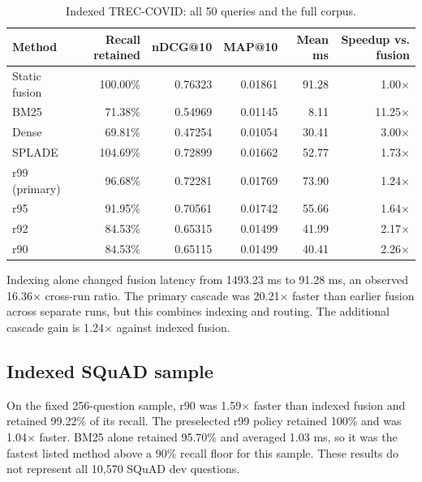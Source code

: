 \documentclass[conference]{IEEEtran}
\begin{document}
\begin{table}[t]
\centering
\caption{Indexed TREC-COVID: all 50 queries and the full corpus.}
\label{tab:trec}
\small
\begin{tabular}{lrrrrr}
\toprule
Method & Recall retained & nDCG@10 & MAP@10 & Mean ms & Speedup vs. fusion\\
\midrule
Static fusion & 100.00\% & 0.76323 & 0.01861 & 91.28 & 1.00$\times$\\
BM25 & 71.38\% & 0.54969 & 0.01145 & 8.11 & 11.25$\times$\\
Dense & 69.81\% & 0.47254 & 0.01054 & 30.41 & 3.00$\times$\\
SPLADE & 104.69\% & 0.72899 & 0.01662 & 52.77 & 1.73$\times$\\
r99 (primary) & 96.68\% & 0.72281 & 0.01769 & 73.90 & 1.24$\times$\\
r95 & 91.95\% & 0.70561 & 0.01742 & 55.66 & 1.64$\times$\\
r92 & 84.53\% & 0.65315 & 0.01499 & 41.99 & 2.17$\times$\\
r90 & 84.53\% & 0.65115 & 0.01499 & 40.41 & 2.26$\times$\\
\bottomrule
\end{tabular}
\end{table}

Indexing alone changed fusion latency from 1493.23 ms to 91.28 ms, an observed 16.36$\times$ cross-run ratio. The primary cascade was 20.21$\times$ faster than earlier fusion across separate runs, but this combines indexing and routing. The additional cascade gain is 1.24$\times$ against indexed fusion.

\subsection{Indexed SQuAD sample}
On the fixed 256-question sample, r90 was 1.59$\times$ faster than indexed fusion and retained 99.22\% of its recall. The preselected r99 policy retained 100\% and was 1.04$\times$ faster. BM25 alone retained 95.70\% and averaged 1.03 ms, so it was the fastest listed method above a 90\% recall floor for this sample. These results do not represent all 10,570 SQuAD dev questions.
\end{document}
